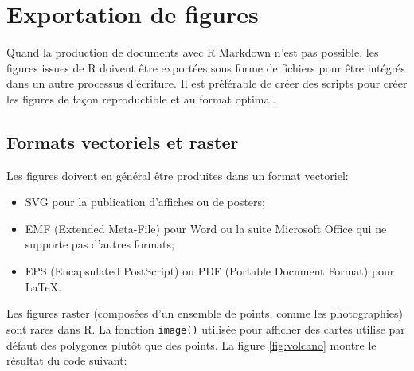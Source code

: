 \documentclass[
  12pt,
  french,
  a4paper,
  extrafontsizes,onecolumn,openright
  ]{memoir}
\providecommand{\tightlist}{%
  \setlength{\itemsep}{0pt}\setlength{\parskip}{0pt}}
\begin{document}
\normalsize

\hypertarget{exportation-de-figures}{%
\section{Exportation de figures}\label{exportation-de-figures}}

Quand la production de documents avec R Markdown n'est pas possible, les figures issues de R doivent être exportées sous forme de fichiers pour être intégrés dans un autre processus d'écriture.
Il est préférable de créer des scripts pour créer les figures de façon reproductible et au format optimal.

\hypertarget{formats-vectoriels-et-raster}{%
\subsection{Formats vectoriels et raster}\label{formats-vectoriels-et-raster}}

Les figures doivent en général être produites dans un format vectoriel:

\begin{itemize}
\tightlist
\item
  SVG pour la publication d'affiches ou de posters;
\item
  EMF (Extended Meta-File) pour Word ou la suite Microsoft Office qui ne supporte pas d'autres formats;
\item
  EPS (Encapsulated PostScript) ou PDF (Portable Document Format) pour LaTeX.
\end{itemize}

Les figures raster (composées d'un ensemble de points, comme les photographies) sont rares dans R.
La fonction \texttt{image()} utilisée pour afficher des cartes utilise par défaut des polygones plutôt que des points.
La figure \ref{fig:volcano} montre le résultat du code suivant:



\scriptsize
\end{document}
